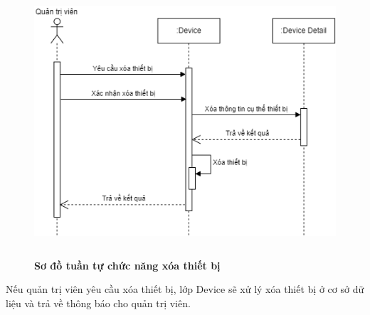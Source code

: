 \begin{figure}[H]
  \centering
  \includegraphics[width=13cm,height=10cm]{Images/sequence/sequence_manage_delete_device.png}
  \caption[Sơ đồ tuần tự chức năng xóa thiết bị]{\bfseries \fontsize{12pt}{0pt}
  \selectfont Sơ đồ tuần tự chức năng xóa thiết bị}
  \label{sequence_manage_delete_device} %
\end{figure}
Nếu quản trị viên yêu cầu xóa thiết bị, lớp Device sẽ xử lý xóa thiết bị ở cơ sở dữ liệu và trả về thông báo cho quản trị viên.



